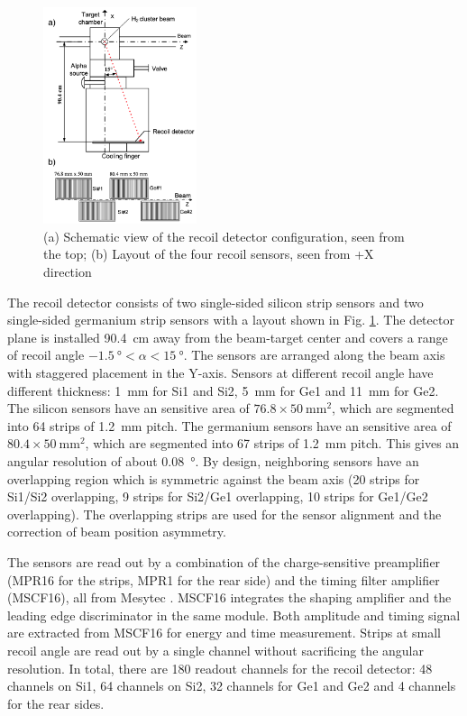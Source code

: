 \documentclass[number,5p]{elsarticle}
\begin{document}
\begin{figure}[htbp]
  \centering
  \includegraphics[width=0.4\textwidth]{./recoil_schematic.png}
  \caption{(a) Schematic view of the recoil detector configuration, seen from the
    top; (b) Layout of the four recoil sensors, seen from +X direction}
  \label{fig:recoil_schematic}
\end{figure}

The recoil detector consists of two single-sided silicon strip sensors and two
single-sided germanium strip sensors with a layout shown in Fig. \ref{fig:recoil_schematic}.
The detector plane is installed \SI{90.4}{\cm} away from the beam-target center
and covers a range of recoil angle $\SI{-1.5}{\degree} < \alpha < \SI{15}{\degree}$.
The sensors are arranged along the beam axis with staggered placement in the Y-axis.
Sensors at different recoil angle have different thickness: \SI{1}{\mm} for Si1
and Si2, \SI{5}{\mm} for Ge1 and \SI{11}{\mm} for Ge2.
The silicon sensors have an sensitive area of $76.8 \times \SI{50}{\mm\squared}$, which are
segmented into 64 strips of \SI{1.2}{\mm} pitch.
The germanium sensors have an sensitive area of \(80.4 \times \SI{50}{\mm\squared}\), which are segmented into 67 strips of \SI{1.2}{\mm} pitch.
This gives an angular resolution of about \SI{0.08}{\degree}.
By design, neighboring sensors have an overlapping region which is symmetric against
the beam axis (20 strips for Si1/Si2 overlapping, 9 strips for Si2/Ge1 overlapping, 10 strips for Ge1/Ge2 overlapping).
The overlapping strips are used for the sensor alignment and the correction of beam position asymmetry.

The sensors are read out by a combination of the charge-sensitive preamplifier (MPR16 for the strips, MPR1 for the rear side) 
and the timing filter amplifier (MSCF16), all from Mesytec \cite{mesytec}. 
MSCF16 integrates the shaping amplifier and the leading edge discriminator in the same module.
Both amplitude and timing signal are extracted from MSCF16 for energy and time measurement.
Strips at small recoil angle are read out by a single channel without sacrificing the angular resolution.
In total, there are 180 readout channels for the recoil detector: 
48 channels on Si1, 64 channels on Si2, 32 channels for Ge1 and Ge2 and 4
channels for the rear sides. 
\end{document}
